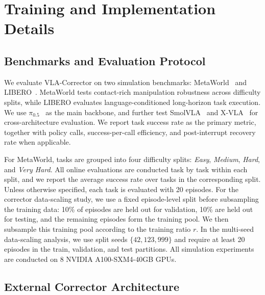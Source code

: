 \section{Training and Implementation Details}
\label{app:implementation_details}

\subsection{Benchmarks and Evaluation Protocol}
\label{app:benchmark_protocol}

We evaluate VLA-Corrector on two simulation benchmarks: MetaWorld~\cite{yu2020meta} and LIBERO~\cite{liu2023libero}. MetaWorld tests contact-rich manipulation robustness across difficulty splits, while LIBERO evaluates language-conditioned long-horizon task execution. We use $\pi_{0.5}$~\cite{intelligence2025pi_} as the main backbone, and further test SmolVLA~\cite{shukor2025smolvla} and X-VLA~\cite{zheng2025x} for cross-architecture evaluation. We report task success rate as the primary metric, together with policy calls, success-per-call efficiency, and post-interrupt recovery rate when applicable.

For MetaWorld, tasks are grouped into four difficulty splits: \emph{Easy}, \emph{Medium}, \emph{Hard}, and \emph{Very Hard}. All online evaluations are conducted task by task within each split, and we report the average success rate over tasks in the corresponding split. Unless otherwise specified, each task is evaluated with 20 episodes. For the corrector data-scaling study, we use a fixed episode-level split before subsampling the training data: 10\% of episodes are held out for validation, 10\% are held out for testing, and the remaining episodes form the training pool. We then subsample this training pool according to the training ratio $r$. In the multi-seed data-scaling analysis, we use split seeds $\{42,123,999\}$ and require at least 20 episodes in the train, validation, and test partitions. All simulation experiments are conducted on 8 NVIDIA A100-SXM4-40GB GPUs.

\subsection{External Corrector Architecture}
\label{app:corrector_architecture}

